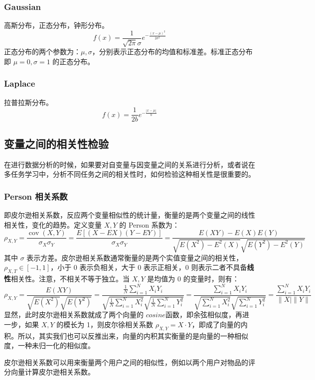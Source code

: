 \subsubsection{Gaussian}高斯分布，正态分布，钟形分布。
$$
f(x) = \frac{1}{\sqrt{2 \pi} \sigma} e^{- \frac{(x - \mu)^2 }{2 \sigma^2}}
$$
正态分布的两个参数为：$\mu, \sigma$，分别表示正态分布的均值和标准差。标准正态分布即 $\mu = 0, \sigma = 1$ 的正态分布。

\subsubsection{Laplace}拉普拉斯分布。
$$
f(x) = \frac{1}{2b} e^{- \frac{{|x - \mu|}}{b}}
$$


\subsection{变量之间的相关性检验}
在进行数据分析的时候，如果要对自变量与因变量之间的关系进行分析，或者说在多任务学习中，分析不同任务之间的相关性时，如何检验这种相关性是很重要的。

\subsubsection{Person 相关系数}
即皮尔逊相关系数，反应两个变量相似性的统计量，衡量的是两个变量之间的线性相关性，变化的趋势。定义变量 $X, Y$ 的 Person 系数为：
$$
\rho_{X, Y}=\frac{\operatorname{cov}(X, Y)}{\sigma_{X} \sigma_{Y}}=\frac{E[(X-E X)(Y-E Y)]}{\sigma_{X} \sigma_{Y}}=\frac{E(X Y)-E(X) E(Y)}{\sqrt{E\left(X^{2}\right)-E^{2}(X)} \sqrt{E\left(Y^{2}\right)-E^{2}(Y)}}
$$
其中 $\sigma$ 表示方差。皮尔逊相关系数通常衡量的是两个实值变量之间的相关性，$\rho_{X, T} \in [-1, 1]$，小于 0 表示负相关，大于 0 表示正相关，0 则表示二者不具备\textbf{线性}相关性。注意，不相关不等于独立。当 $X, Y$ 是均值为 0 的变量时，则有：
$$
\rho_{X, Y}=\frac{E(X Y)}{\sqrt{E\left(X^{2}\right)} \sqrt{E\left(Y^{2}\right)}}=\frac{\frac{1}{N} \sum_{i=1}^{N} X_{i} Y_{i}}{\sqrt{\frac{1}{N} \sum_{i=1}^{N} X_{i}^{2}} \sqrt{\frac{1}{N} \sum_{i=1}^{N} Y_{i}^{2}}}=\frac{\sum_{i=1}^{N} X_{i} Y_{i}}{\sqrt{\sum_{i=1}^{N} X_{i}^{2}} \sqrt{\sum_{i=1}^{N} Y_{i}^{2}}}=\frac{\sum_{i=1}^{N} X_{i} Y_{i}}{\|X \mid\| Y \|}
$$
显然，此时皮尔逊相关系数就成了两个向量的 $cosine$函数，即余弦相似度，再进一步，如果 $X, Y$ 的模长为 1，则皮尔徐相关系数 $\rho_{X, Y} = X \cdot Y$，即成了向量的内积。所以，其实我们也可以反推出来，向量的内积其实衡量的是向量的一种相似度，一种未归一化的相似度。

皮尔逊相关系数可以用来衡量两个用户之间的相似性，例如以两个用户对物品的评分向量计算皮尔逊相关系数。

